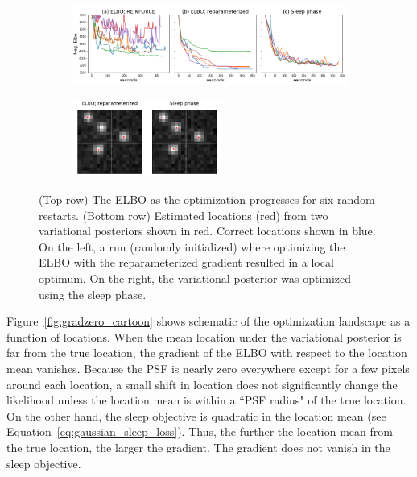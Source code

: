 \begin{figure}[!htb]
    \centering
    \begin{subfigure}[t]{0.9\textwidth}
    \centering
    \includegraphics[width=\textwidth]{figures/optim_path_compare.png}
    \end{subfigure}
    \begin{subfigure}[t]{\textwidth}
    \centering
    \includegraphics[width=0.55\textwidth]{figures/optim_path_detect_compare.png}
    \end{subfigure}
    \vspace{-3em}
    \caption{(Top row) The ELBO as the optimization progresses for six random restarts. 
    (Bottom row) Estimated locations (red) from two variational posteriors shown in red. 
    Correct locations shown in blue. 
    On the left, a run (randomly initialized) where optimizing the ELBO with the reparameterized gradient resulted in a local optimum.
    On the right, the variational posterior 
    was optimized using the sleep phase. }
    \label{fig:optim_path}
\end{figure}

Figure~\ref{fig:gradzero_cartoon} shows schematic of the optimization landscape as a function of locations.
When the mean location under the variational posterior is far from the true location, the gradient of the ELBO with respect to the location mean vanishes. 
Because the PSF is nearly zero everywhere except for a few pixels around each location, a small shift in location does not significantly change the likelihood unless the location mean is within a ``PSF radius" of the true location.
On the other hand, the sleep objective is quadratic in the location mean (see Equation~\ref{eq:gaussian_sleep_loss}).
Thus, the further the location mean from the true location, the larger the gradient. The gradient does not vanish in the sleep objective. 

